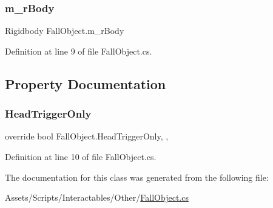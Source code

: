 \subsubsection{\texorpdfstring{m\+\_\+r\+Body}{m\_rBody}}
{\footnotesize\ttfamily Rigidbody Fall\+Object.\+m\+\_\+r\+Body}



Definition at line 9 of file Fall\+Object.\+cs.



\subsection{Property Documentation}
\mbox{\label{class_fall_object_aebc6a71d3e9e237a19162996cc241ef0}} 
\subsubsection{\texorpdfstring{Head\+Trigger\+Only}{HeadTriggerOnly}}
{\footnotesize\ttfamily override bool Fall\+Object.\+Head\+Trigger\+Only\hspace{0.3cm}{\ttfamily [get]}, {\ttfamily [set]}, {\ttfamily [protected]}}



Definition at line 10 of file Fall\+Object.\+cs.



The documentation for this class was generated from the following file\+:\begin{DoxyCompactItemize}
\item 
Assets/\+Scripts/\+Interactables/\+Other/\mbox{\hyperlink{_fall_object_8cs}{Fall\+Object.\+cs}}\end{DoxyCompactItemize}
